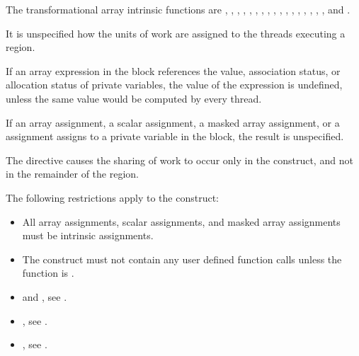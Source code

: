 The transformational array intrinsic functions are , , , 
, , , , 
, , , , , 
, , , , , and .

It is unspecified how the units of work are assigned to the threads executing a 
 region.

If an array expression in the block references the value, association status, or allocation 
status of private variables, the value of the expression is undefined, unless the same 
value would be computed by every thread.

If an array assignment, a scalar assignment, a masked array assignment, or a  
assignment assigns to a private variable in the block, the result is unspecified.

The  directive causes the sharing of work to occur only in the  
construct, and not in the remainder of the  region.

{}

\begin{samepage}
\restrictions
The following restrictions apply to the  construct:

\begin{itemize}
\item All array assignments, scalar assignments, and masked array assignments must be 
intrinsic assignments.

\item The construct must not contain any user defined function calls unless the function is 
.
\end{itemize}
\end{samepage}

\crossreferences
\begin{itemize}
\item {} and , see
  .
\item {}, see .
\item {}, see
.
\end{itemize}

\filbreak
\fortranspecificend
